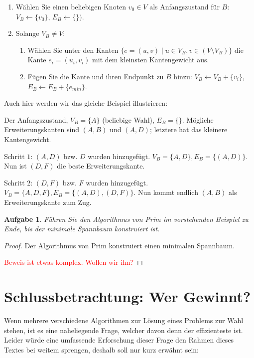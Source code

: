 \documentclass[12pt,a4paper]{report}
\theoremstyle{break}
\newtheorem{exercise}{Aufgabe}[section]
\theoremstyle{plain}
\newtheorem{proof}{Satz}[section]
\newcommand{\algostep}[2]{\parbox{4cm}{\scalebox{0.5}{\texttt{[image: \#1]}}}
  \hfill
  \parbox{7cm}{#2}
}
\begin{document}
\begin{enumerate}
\item W\"{a}hlen Sie einen beliebigen Knoten $v_0\in V$ als
  Anfangszustand f\"{u}r $B$: $V_B \gets \{v_0\}$, $E_B \gets \{\})$.
\item Solange $V_B\neq V$:
\begin{enumerate}
\item W\"{a}hlen Sie unter den Kanten $\{e = (u,v)\mid u\in V_B, v\in
  (V\!\setminus\!V_B)\}$ die Kante $e_i= (u_i,v_i)$ mit dem kleinsten
Kantengewicht aus.
\item F\"{u}gen Sie die Kante und ihren Endpunkt zu $B$ hinzu: $V_B \gets
  V_B+\{v_i\}$, $E_B \gets E_B+\{e_{min}\}$.
\end{enumerate}
\end{enumerate}

\newpage
Auch hier werden wir das gleiche Beispiel illustrieren:

\algostep{DemoPrim1.pdf}{Der Anfangszustand, $V_B = \{A\}$ (beliebige
  Wahl), $E_B = \{\}$. M\"{o}gliche Erweiterungskanten sind $(A,B)$
  und $(A,D)$; letztere hat das kleinere Kantengewicht.}
\algostep{DemoPrim2.pdf}{Schritt $1$: $(A,D)$ bzw. $D$ wurden
  hinzugef\"{u}gt. $V_B = \{A,D\}, E_B=\{(A,D)\}$. Nun ist $(D,F)$ die
  beste Erweiterungskante.}
\algostep{DemoPrim3.pdf}{Schritt $2$: $(D,F)$ bzw. $F$ wurden 
 hinzugef\"{u}gt. $V_B = \{A,D,F\}, E_B=\{(A,D), (D,F)\}$. Nun kommt
 endlich $(A,B)$ als Erweiterungskante zum Zug.}

\begin{exercise}\label{exprim}
F\"{u}hren Sie den Algorithmus von Prim im vorstehenden Beispiel zu
Ende, bis der minimale Spannbaum konstruiert ist.
\end{exercise}

\begin{proof}\label{primproof}Der Algorithmus von Prim konstruiert
  einen minimalen Spannbaum.

\textcolor{red}{Beweis ist etwas komplex. Wollen wir ihn?}
\end{proof}

\section{Schlussbetrachtung: Wer Gewinnt?}

Wenn mehrere verschiedene Algorithmen zur L\"{o}sung eines Problems
zur Wahl stehen, ist es eine naheliegende Frage, welcher davon denn
der effizienteste ist. Leider w\"{u}rde eine umfassende Erforschung dieser
Frage den Rahmen dieses Textes bei weitem sprengen, deshalb soll nur
kurz erw\"{a}hnt sein:
\end{document}
